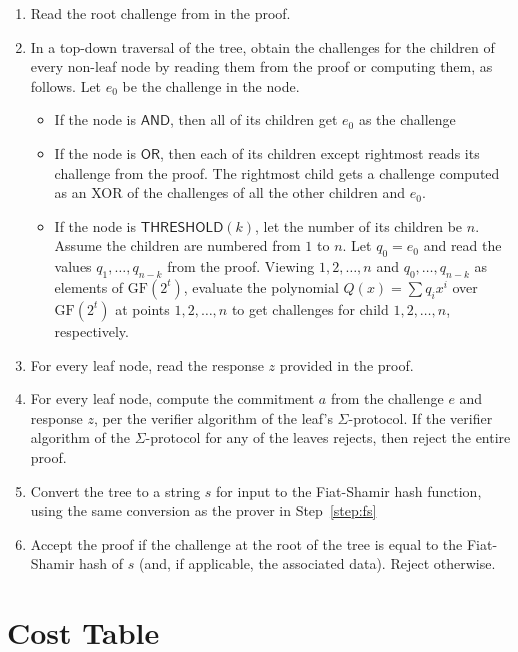 \documentclass[11pt]{article}
\newcommand{\andnode}{\ensuremath{\mathsf{AND}}}
\newcommand{\ornode}{\ensuremath{\mathsf{OR}}}
\newcommand{\tnode}{\ensuremath{\mathsf{THRESHOLD}}}
\newcommand{\GF}{\ensuremath{\mathrm{GF}}}
\begin{document}
\begin{enumerate}
\item Read the root challenge from in the proof. 

\item In a top-down traversal of the tree, obtain the challenges for the children of every non-leaf node by reading them from the proof or computing them, as follows. Let $e_0$ be the challenge in the node. 
        \begin{itemize}
            \item If the node is $\andnode$,  then all of its children get $e_0$ as the challenge
            \item If the node is $\ornode$, then each of its children except rightmost reads its challenge from the proof. The rightmost child gets a challenge computed as an XOR of the challenges of all the other children and $e_0$.
            \item If the node is $\tnode(k)$, let the number of its children be $n$. Assume the children are numbered from $1$ to $n$. Let $q_0=e_0$ and read the values $q_1, \dots, q_{n-k}$ from the proof. Viewing $1, 2, \dots, n$ and $q_0, \dots, q_{n-k}$ as elements of $\GF(2^t)$, evaluate the polynomial $Q(x) = \sum {q_i x^i}$ over $\GF(2^t)$ at points $1, 2, \dots, n$ to get challenges for child $1, 2, \dots, n$, respectively. 
        \end{itemize}
        
 \item For every leaf node, read the response $z$ provided in the proof.

\item For every leaf node, compute the commitment $a$ from the challenge $e$ and response $z$, per the verifier algorithm of the leaf's $\Sigma$-protocol. If the verifier algorithm of the $\Sigma$-protocol for any of the leaves rejects, then reject the entire proof.

\item Convert the tree to a string $s$ for input to the Fiat-Shamir hash function, using the same conversion as the prover in Step~\ref{step:fs}

\item Accept the proof if the challenge at the root of the tree is equal to the Fiat-Shamir hash of $s$ (and, if applicable,  the associated data). Reject otherwise.
\end{enumerate}


\section{Cost Table}
\end{document}
